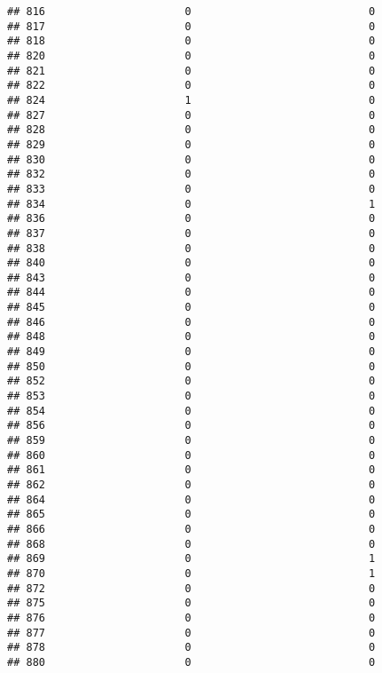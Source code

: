 \documentclass[
]{article}
\begin{document}
\begin{verbatim}
## 816                      0                            0
## 817                      0                            0
## 818                      0                            0
## 820                      0                            0
## 821                      0                            0
## 822                      0                            0
## 824                      1                            0
## 827                      0                            0
## 828                      0                            0
## 829                      0                            0
## 830                      0                            0
## 832                      0                            0
## 833                      0                            0
## 834                      0                            1
## 836                      0                            0
## 837                      0                            0
## 838                      0                            0
## 840                      0                            0
## 843                      0                            0
## 844                      0                            0
## 845                      0                            0
## 846                      0                            0
## 848                      0                            0
## 849                      0                            0
## 850                      0                            0
## 852                      0                            0
## 853                      0                            0
## 854                      0                            0
## 856                      0                            0
## 859                      0                            0
## 860                      0                            0
## 861                      0                            0
## 862                      0                            0
## 864                      0                            0
## 865                      0                            0
## 866                      0                            0
## 868                      0                            0
## 869                      0                            1
## 870                      0                            1
## 872                      0                            0
## 875                      0                            0
## 876                      0                            0
## 877                      0                            0
## 878                      0                            0
## 880                      0                            0

\end{verbatim}
\end{document}
